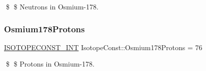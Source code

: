 \$ \$ Neutrons in Osmium-\/178. \mbox{\label{group___isotope_const-_osmium-_os178_gaff091ee594e1d6b12a9a0aa227bfe575}} 
\subsubsection{\texorpdfstring{Osmium178\+Protons}{Osmium178Protons}}
{\footnotesize\ttfamily \mbox{\hyperlink{group___isotope_const-_macros_ga5f18360b3e99483a35c32d789e62621c}{I\+S\+O\+T\+O\+P\+E\+C\+O\+N\+S\+T\+\_\+\+I\+NT}} Isotope\+Const\+::\+Osmium178\+Protons = 76}

\$ \$ Protons in Osmium-\/178. 
